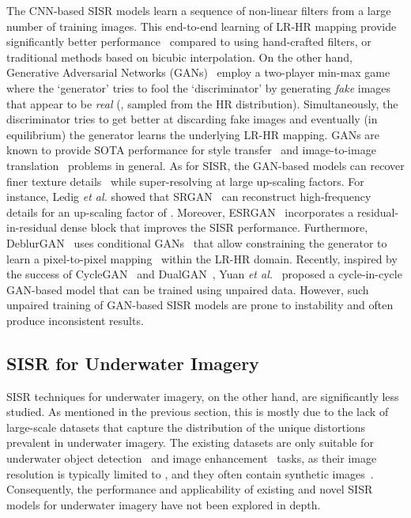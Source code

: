 \documentclass[10pt,twocolumn,letterpaper]{article}
\begin{document}
The CNN-based SISR models learn a sequence of non-linear filters from a large number of training images. This end-to-end learning of LR-HR mapping provide significantly better performance~\cite{yang2019deep} compared to using hand-crafted filters, or traditional methods based on bicubic interpolation. 
On the other hand, Generative Adversarial Networks (GANs)~\cite{goodfellow2014generative} employ a two-player min-max game where the `generator' tries to fool the `discriminator' by generating \textit{fake} images that appear to be \textit{real} (\ie, sampled from the HR distribution). Simultaneously, the discriminator tries to get better at discarding fake images and eventually (in equilibrium) the generator learns the underlying LR-HR mapping. 
GANs are known to provide SOTA performance for style transfer~\cite{gatys2016image} and image-to-image translation~\cite{isola2017image} problems in general.  
As for SISR, the GAN-based models can recover finer texture details~\cite{sonderby2016amortised,chen2018efficient} while super-resolving at large up-scaling factors. 
For instance, Ledig \textit{et al.} showed that SRGAN~\cite{ledig2017photo} can reconstruct high-frequency details for an up-scaling factor of . Moreover, ESRGAN~\cite{wang2018esrgan} incorporates a  residual-in-residual dense block that improves the SISR performance.  
Furthermore, DeblurGAN~\cite{kupyn2018deblurgan} uses conditional GANs~\cite{mirza2014conditional} that allow constraining the generator to learn a pixel-to-pixel mapping~\cite{isola2017image} within the LR-HR domain. 
Recently, inspired by the success of CycleGAN~\cite{zhu2017unpaired} and DualGAN~\cite{yi2017dualgan}, Yuan \textit{et al.}~\cite{yuan2018unsupervised} proposed a cycle-in-cycle GAN-based model that can be trained using unpaired data. However, such unpaired training of GAN-based SISR models are prone to instability and often produce inconsistent results.     



\subsection{SISR for Underwater Imagery}
SISR techniques for underwater imagery, on the other hand, are significantly less studied. 
As mentioned in the previous section, this is mostly due to the lack of large-scale datasets that capture the distribution of the unique distortions prevalent in underwater imagery. The existing datasets are only suitable for underwater object detection~\cite{islam2018understanding} and image enhancement~\cite{islam2019fast} tasks, as their image resolution is typically limited to , and they often contain synthetic images~\cite{fabbri2018enhancing}. Consequently, the performance and applicability of existing and novel SISR models for underwater imagery have not been explored in depth. 
\end{document}
